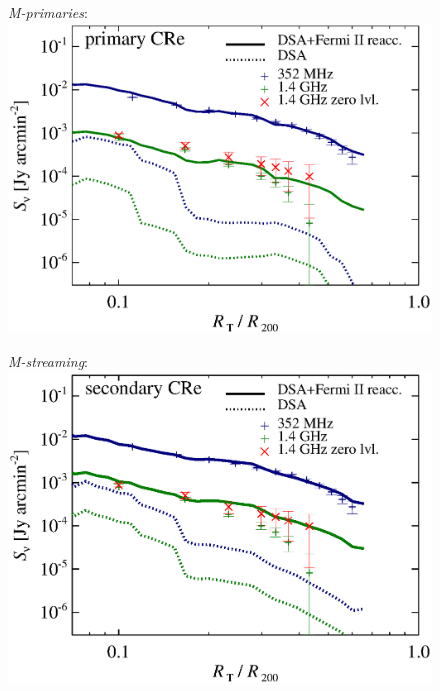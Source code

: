 \documentclass[a4paper,fleqn,usenatbib]{mnras}
\newcommand{\Mstream}{{\it M-streaming}\xspace}
\newcommand{\Mprimary}{{\it M-primaries}\xspace}
\begin{document}
\begin{figure}
\begin{minipage}{1\columnwidth}
   \begin{center}\Large{\Mprimary:}\\
     \includegraphics[width=\columnwidth]{sbright.nu.DIIcomp.Pri.g72a.Rad14.2400p.z0.NL.xKR.eb23.eI088.140.v6.eps}
   \end{center}
\end{minipage}
\begin{minipage}{1\columnwidth}
   \begin{center}\Large{\Mstream:}\\
     \includegraphics[width=\columnwidth]{sbright.nu.DIIcomp.flatCR.g72a.Rad14.2400p.z0.NL.xKR.eb23.eI082.flatCR.140.v6.eps}

\end{center}
\end{minipage}
\end{figure}
\end{document}
